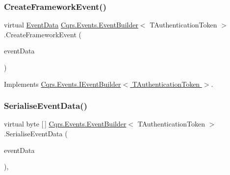 \subsubsection{\texorpdfstring{Create\+Framework\+Event()}{CreateFrameworkEvent()}\hspace{0.1cm}{\footnotesize\ttfamily [2/2]}}
{\footnotesize\ttfamily virtual \hyperlink{classCqrs_1_1Events_1_1EventData}{Event\+Data} \hyperlink{classCqrs_1_1Events_1_1EventBuilder}{Cqrs.\+Events.\+Event\+Builder}$<$ T\+Authentication\+Token $>$.Create\+Framework\+Event (\begin{DoxyParamCaption}\item[{\hyperlink{interfaceCqrs_1_1Events_1_1IEvent}{I\+Event}$<$ T\+Authentication\+Token $>$}]{event\+Data }\end{DoxyParamCaption})\hspace{0.3cm}{\ttfamily [virtual]}}



Implements \hyperlink{interfaceCqrs_1_1Events_1_1IEventBuilder_a3c0cb2db87e496ad64f481a6cce2c79d}{Cqrs.\+Events.\+I\+Event\+Builder$<$ T\+Authentication\+Token $>$}.

\mbox{\label{classCqrs_1_1Events_1_1EventBuilder_a5392c1e86ea54fb96ee7af3a57f9af5a}} 
\subsubsection{\texorpdfstring{Serialise\+Event\+Data()}{SerialiseEventData()}}
{\footnotesize\ttfamily virtual byte \mbox{[}$\,$\mbox{]} \hyperlink{classCqrs_1_1Events_1_1EventBuilder}{Cqrs.\+Events.\+Event\+Builder}$<$ T\+Authentication\+Token $>$.Serialise\+Event\+Data (\begin{DoxyParamCaption}\item[{\hyperlink{interfaceCqrs_1_1Events_1_1IEvent}{I\+Event}$<$ T\+Authentication\+Token $>$}]{event\+Data }\end{DoxyParamCaption})\hspace{0.3cm}{\ttfamily [protected]}, {\ttfamily [virtual]}}

\mbox{\label{classCqrs_1_1Events_1_1EventBuilder_aefa7bfaea90123e143e108d46efc6603}} 
